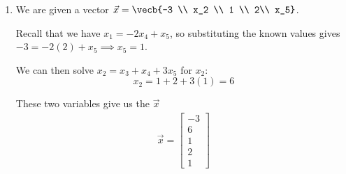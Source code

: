 \begin{Answer}[ref={nullspace1}]
\begin{enumerate}[label=\alph*]
So a basis can be formed by the set
$$\begin{array}{c}
\left\{
\begin{bmatrix}0\\1\\1\\0\\0\end{bmatrix},
\begin{bmatrix}-2\\1\\0\\1\\0\end{bmatrix},
\begin{bmatrix}1\\3\\0\\0\\1\end{bmatrix}
\right\}
\end{array}$$
\item We are given a vector $\vec{x} = \vecb{-3 \\ x_2 \\ 1 \\ 2\\ x_5}$. 

Recall that we have $x_1 = -2x_4+x_5$, so substituting the known values gives $-3 = -2(2) + x_5 \implies x_5 = 1$.

We can then solve $x_2=x_3+x_4+3x_5$ for $x_2$:
$$x_2 = 1 + 2 + 3(1) = 6$$

These two variables give us the $\vec{x}$
$$\begin{array}{c}
\vec x=
\begin{bmatrix}
-3\\
6\\
1\\
2\\
1
\end{bmatrix} \end{array}$$
\end{enumerate}
\end{Answer}

